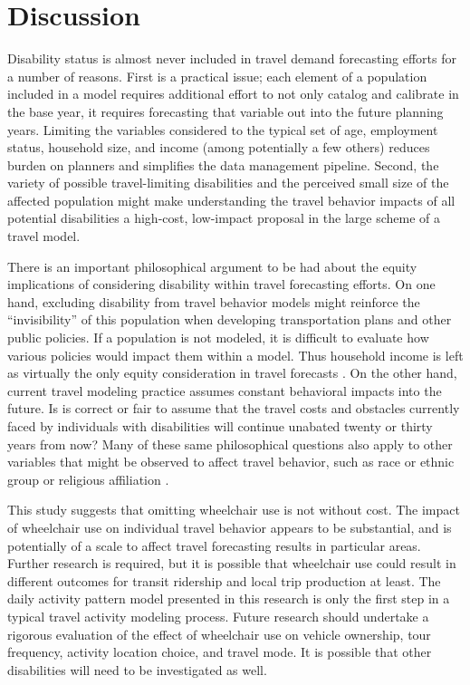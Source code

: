 \documentclass[3p, authoryear, review]{elsarticle} %
\begin{document}
\hypertarget{discussion}{%
\section{Discussion}\label{discussion}}

Disability status is almost never included in travel demand forecasting
efforts for a number of reasons. First is a practical issue; each element
of a population included in a model requires additional effort to not only catalog
and calibrate in the base year, it requires forecasting that variable out into
the future planning years. Limiting the variables considered to the typical set
of age, employment status, household size, and income (among potentially a few
others) reduces burden on planners and simplifies the data management pipeline.
Second, the variety of possible travel-limiting disabilities and the perceived
small size of the affected population might make understanding the travel
behavior impacts of all potential disabilities a high-cost, low-impact proposal
in the large scheme of a travel model.

There is an important philosophical argument to be had about the equity
implications of considering disability within travel forecasting efforts. On
one hand, excluding disability from travel behavior models might reinforce the
``invisibility'' of this population when developing transportation plans and other
public policies. If a population is not modeled, it is difficult to evaluate how
various policies would impact them within a model. Thus household income is left
as virtually the only equity consideration in travel forecasts \citep{bills2012}.
On the other hand, current
travel modeling practice assumes constant behavioral impacts into the future. Is
is correct or fair to assume that the travel costs and obstacles currently
faced by individuals with disabilities will continue unabated twenty or thirty
years from now? Many of these same philosophical questions also apply to
other variables that might be observed to affect travel behavior, such as race
or ethnic group or religious affiliation \citep[e.g.,][]{vyas2015}.

This study suggests that omitting wheelchair use is not without cost.
The impact of wheelchair use on individual travel behavior appears to be
substantial, and is potentially of a scale to affect travel forecasting results
in particular areas. Further research is required, but it is possible that wheelchair
use could result in different outcomes for transit ridership and local trip
production at least. The daily activity pattern model presented in this research
is only the first step in a typical travel activity modeling process. Future
research should undertake a rigorous evaluation of the effect of wheelchair use
on vehicle ownership, tour frequency, activity location choice, and travel mode.
It is possible that other disabilities will need to be investigated as well.
\end{document}
